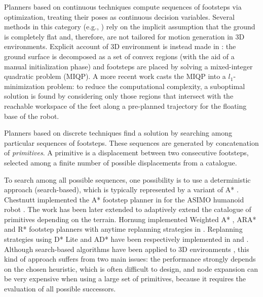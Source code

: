 Planners based on continuous techniques compute sequences of footsteps via
optimization, treating their poses as continuous decision variables. 
Several methods in this category (e.g., \cite{Ibanez2014IROS, Hong2011TSMC,
Kasadei2021SNAS}) rely on the implicit assumption that the ground is completely
flat and, therefore, are not tailored for motion generation in 3D environments.
Explicit account of 3D environment is instead made in
\cite{Deits2014FootstepPlanningMIQCQP}: the ground surface is decomposed as a
set of convex regions (with the aid of a manual initialization phase) and
footsteps are placed by solving a mixed-integer quadratic problem (MIQP). 
A more recent work \cite{Song2021RAL} casts the MIQP into a $l_1$-minimization
problem: to reduce the computational complexity, a suboptimal solution is
found by considering only those regions that intersect with the reachable
workspace of the feet along a pre-planned trajectory for the floating base
of the robot.

Planners based on discrete techniques find a solution by searching among
particular sequences of footsteps. These sequences are generated by
concatenation of \emph{primitives}. A primitive is a displacement between two
consecutive footsteps, selected among a finite number of possible displacements
from a catalogue.

To search among all possible sequences, one possibility is to use a
deterministic approach (search-based), which is typically represented by a variant of A* \cite{Hart1968Astar}.
Chestnutt implemented the A* footstep planner in \cite{Chestnutt2005FootstepPlanningASIMO}
for the ASIMO humanoid robot \cite{Sakagami2002ASIMO}. The work has been later 
extended to adaptively extend the catalogue of primitives
\cite{Chestnutt2007AdaptiveActionModel} depending on the terrain.
Hornung implemented Weighted A* \cite{Pearl1984Heuristics},
ARA* \cite{Likhachev2003ARAstar} and R* \cite{Likhachev2008Rstar}
footstep planners with anytime 
replanning strategies in \cite{Hornung2012AnytimeSearchbasedFootstepPlanning}.
Replanning strategies using D* Lite \cite{Koenig2002Dlite} and AD*
\cite{Likhachev2005ADstar} have been respectively implemented in
\cite{Gairmort2011HumanoidNavigationwithDynamicFootstepPlans} and 
\cite{Hornung2012AdaptiveLevelofDetailPlanning}.
Although search-based algorithms have been applied to 3D environments
\cite{Griffin2019ICRA}, this kind of approach suffers from two main issues: the
performance strongly depends on the chosen heuristic, which is often difficult
to design, and node expansion can be very expensive when using a large set of
primitives, because it requires the evaluation of all possible successors.

